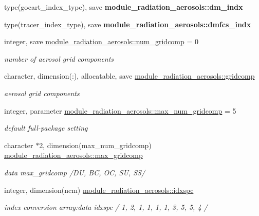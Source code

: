 \begin{DoxyCompactItemize}
\item 
type(gocart\+\_\+index\+\_\+type), save {\bfseries module\+\_\+radiation\+\_\+aerosols\+::dm\+\_\+indx}
\item 
type(tracer\+\_\+index\+\_\+type), save {\bfseries module\+\_\+radiation\+\_\+aerosols\+::dmfcs\+\_\+indx}
\item 
integer, save \hyperlink{group__module__radiation__aerosols_ga6ddeb7b34ad2d6ab1575be3520e85891}{module\+\_\+radiation\+\_\+aerosols\+::num\+\_\+gridcomp} = 0
\begin{DoxyCompactList}\small\item\em number of aerosol grid components \end{DoxyCompactList}\item 
character, dimension(\+:), allocatable, save \hyperlink{group__module__radiation__aerosols_ga48c2c6c9c509f5c37fea5d788040ad7a}{module\+\_\+radiation\+\_\+aerosols\+::gridcomp}
\begin{DoxyCompactList}\small\item\em aerosol grid components \end{DoxyCompactList}\item 
integer, parameter \hyperlink{group__module__radiation__aerosols_gad1187b5d87889c68cbe5929e20e83ac7}{module\+\_\+radiation\+\_\+aerosols\+::max\+\_\+num\+\_\+gridcomp} = 5
\begin{DoxyCompactList}\small\item\em default full-\/package setting \end{DoxyCompactList}\item 
character $\ast$2, dimension(max\+\_\+num\+\_\+gridcomp) \hyperlink{group__module__radiation__aerosols_gac8278b0db773d6ba6ab4d71c9bb1b109}{module\+\_\+radiation\+\_\+aerosols\+::max\+\_\+gridcomp}
\begin{DoxyCompactList}\small\item\em data max\+\_\+gridcomp /\textquotesingle{}DU\textquotesingle{}, \textquotesingle{}BC\textquotesingle{}, \textquotesingle{}OC\textquotesingle{}, \textquotesingle{}SU\textquotesingle{}, \textquotesingle{}SS\textquotesingle{}/ \end{DoxyCompactList}\item 
integer, dimension(ncm) \hyperlink{group__module__radiation__aerosols_ga8ca79ca1e5161374aff3cad4121b360f}{module\+\_\+radiation\+\_\+aerosols\+::idxspc}
\begin{DoxyCompactList}\small\item\em index conversion array\+:data idxspc / 1, 2, 1, 1, 1, 1, 3, 5, 5, 4 / \end{DoxyCompactList}\item 

\end{DoxyCompactItemize}
